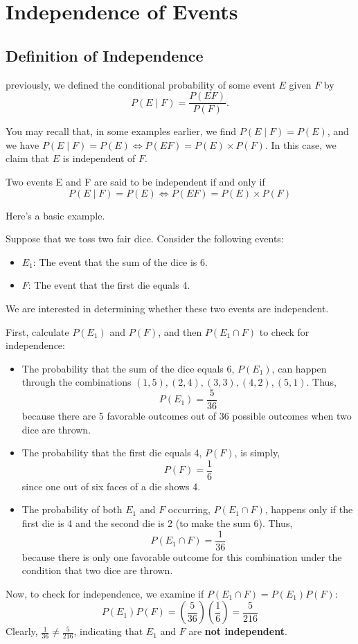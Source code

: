 \section{Independence of Events}

\subsection{Definition of Independence}
previously, we defined the conditional probability of some event $E$ given $F$
by \[P(E\mid F)= \frac{P(EF)}{P(F)}.\]

You may recall that, in some examples earlier, we find $P(E\mid F) = P(E)$,
and we have $P(E\mid F)=P(E) \iff P(EF) = P(E) \times P(F)$. In this case, we claim that 
$E$ is independent of $F$.
\begin{definition}
    Two events E and F are said to be independent if and only if 
    \begin{equation}
        P(E\mid F)=P(E) \iff P(EF) = P(E) \times P(F)
    \end{equation}
\end{definition}
Here's a basic example.
\begin{example}
    Suppose that we toss two fair dice. Consider the following events:
\begin{itemize}
    \item \(E_1\): The event that the sum of the dice is 6.
    \item \(F\): The event that the first die equals 4.
\end{itemize}
We are interested in determining whether these two events are independent.
\begin{solution}
    First, calculate \(P(E_1)\) and \(P(F)\), and then \(P(E_1 \cap F)\) to check for independence:
\begin{itemize}
    \item The probability that the sum of the dice equals 6, \(P(E_1)\), can happen through the combinations \((1,5), (2,4), (3,3), (4,2), (5,1)\). Thus,
    \[
    P(E_1) = \frac{5}{36}
    \]
    because there are 5 favorable outcomes out of 36 possible outcomes when two dice are thrown.
    
    \item The probability that the first die equals 4, \(P(F)\), is simply,
    \[
    P(F) = \frac{1}{6}
    \]
    since one out of six faces of a die shows 4.

    \item The probability of both \(E_1\) and \(F\) occurring, \(P(E_1 \cap F)\), happens only if the first die is 4 and the second die is 2 (to make the sum 6). Thus,
    \[
    P(E_1 \cap F) = \frac{1}{36}
    \]
    because there is only one favorable outcome for this combination under the condition that two dice are thrown.
\end{itemize}

Now, to check for independence, we examine if \(P(E_1 \cap F) = P(E_1)P(F)\):
\[
P(E_1)P(F) = \left(\frac{5}{36}\right)\left(\frac{1}{6}\right) = \frac{5}{216}
\]
Clearly, \(\frac{1}{36} \neq \frac{5}{216}\), indicating that \(E_1\) and \(F\) are \textbf{not independent}.
\end{solution}
\end{example}
